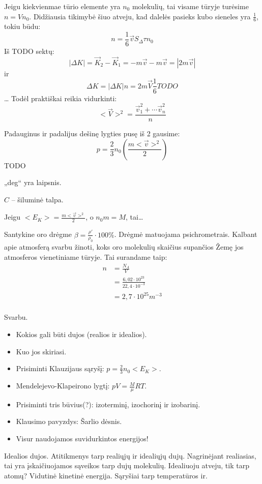 Jeigu kiekvienmae tūrio elemente yra $n_{0}$ molekulių, tai visame tūryje
turėsime $n = Vn_{0}$. Didžiausia tikimybė šiuo atveju, kad dalelės pasieks
kubo sieneles yra $\frac{1}{6}$, tokiu būdu:
\begin{equation}
  n = \frac{1}{6} \vec{v}S_{\Delta}\tau n_{0}
  \label{eq:dujos}
\end{equation}
Iš TODO sektų:
\begin{equation*}
  |\Delta K | = \vec{K}_{2} - \vec{K}_{1} = - m \vec{v} - m \vec{v} =
  |2m\vec{v}|
\end{equation*}
ir 
\begin{equation*}
  \Delta K = |\Delta K| n = 2m \vec{V} \frac{1}{6} TODO
\end{equation*}
…
Todėl praktiškai reikia vidurkinti:
\begin{equation*}
  <\vec{V}>^{2} = \frac{\vec{v}_{1}^{2} + \cdots \vec{v}^{2}_{n}}{n}
\end{equation*}

Padauginus ir padalijus dešinę lygties pusę iš 2 gausime:
\begin{equation*}
  p = \frac{2}{3} n_{0} \left( \frac{m <\vec{v}>^{2}}{2} \right)
\end{equation*}
TODO

„deg“ yra laipsnis.

$C$ – šiluminė talpa.

Jeigu $<E_{K}> = \frac{m <\vec{v}>^{2}}{2}$, o $n_{0}m = M$, tai…

Santykine oro drėgme $\beta = \frac{\rho'}{\rho_{0}} \cdot 100 \%$.
Drėgmė matuojama psichrometrais. Kalbant apie atmosferą svarbu
žinoti, koks oro molekulių skaičius supančios Žemę jos atmosferos
vienetiniame tūryje. Tai surandame taip:
\begin{align*}
  n
  &= \frac{N_{A}}{V} \\
  &= \frac{6,02 \cdot 10^{23}}{22,4 \cdot 10 ^{-3}} \\
  &= 2,7 \cdot 10 ^{25} m^{-3} \\
\end{align*}

Svarbu.
\begin{itemize}
  \item Kokios gali būti dujos (realios ir idealios).
  \item Kuo jos skiriasi.
  \item Prisiminti Klauzijaus sąryšį: $p = \frac{2}{3} n_{0} <E_{K}>$.
  \item Mendelejevo-Klapeirono lygtį: $pV = \frac{M}{\mu}RT$.
  \item Prisiminti tris būvius(?): izoterminį, izochorinį ir izobarinį.
  \item Klausimo pavyzdys: Šarlio dėsnis.
  \item Visur naudojamos suvidurkintos energijos!
\end{itemize}

Idealios dujos. Atitikmenys tarp realiųjų ir idealiųjų dujų. Nagrinėjant
realiasias, tai yra įskaičiuojamos sąveikos tarp dujų molekulių. Idealiuoju
atveju, tik tarp atomų? Vidutinė kinetinė energija. Sąryšiai tarp
temperatūros ir.
